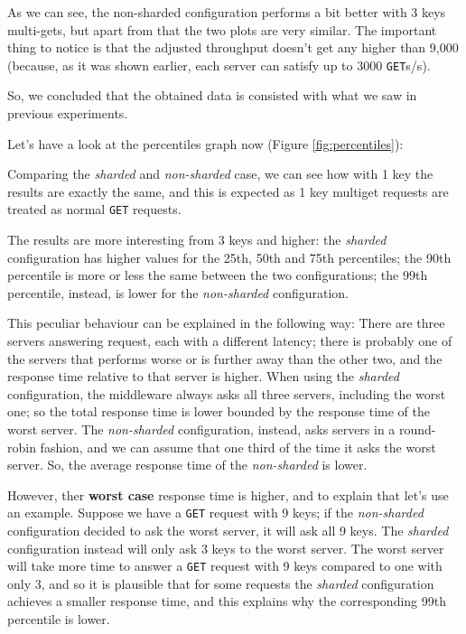 \documentclass[11pt,a4paper]{article}
\renewcommand{\t}[1]{%
	{\texttt{#1}}}
\begin{document}
As we can see, the non-sharded configuration performs a bit better with 3 keys
multi-gets, but apart from that the two plots are very similar.  The important
thing to notice is that the adjusted throughput doesn't get any higher than
9,000 (because, as it was 
shown earlier, each server can satisfy up to 3000 \t{GET}s/s). 

So, we concluded that the obtained data is consisted with what we saw in previous experiments.


\vspace{1em}
Let's have a look at the percentiles graph now (Figure \ref{fig:percentiles}): 

Comparing the \emph{sharded} and \emph{non-sharded} case, we can see how
with 1 key the results are exactly the same, and this is expected as 1 key
multiget requests are treated as normal \t{GET} requests.

The results are more interesting from 3 keys and higher:
the \emph{sharded} configuration has higher values for the 25th, 50th and 75th
percentiles; the 90th percentile is more or less the same between the two configurations;
the 99th percentile, instead, is lower for the \emph{non-sharded} configuration.

This peculiar behaviour can be explained in the following way:
There are three servers answering request, each with a different latency; there is 
probably one of the servers that performs worse or is further away than the other two,
and the response time relative to that server is higher. When using the \emph{sharded} configuration,
the middleware always asks all three servers, including the worst one; so the total response
time is lower bounded by the response time of the worst server.
The \emph{non-sharded} configuration, instead, asks servers in a round-robin fashion, and we 
can assume that one third of the time it asks the worst server. 
So, the average response time of the \emph{non-sharded} is lower.

However, ther \textbf{worst case} response time is higher, and to explain that let's use an example.
Suppose we have a \t{GET} request with 9 keys; if the \emph{non-sharded} configuration decided
to ask the worst server, it will ask all 9 keys. The \emph{sharded} configuration instead
will only ask 3 keys to the worst server. The worst server will take more time to answer
a \t{GET} request with 9 keys compared to one with only 3, and so it is plausible that for
some requests the \emph{sharded} configuration achieves a smaller response time, and this
explains why the corresponding 99th percentile is lower.
\end{document}
